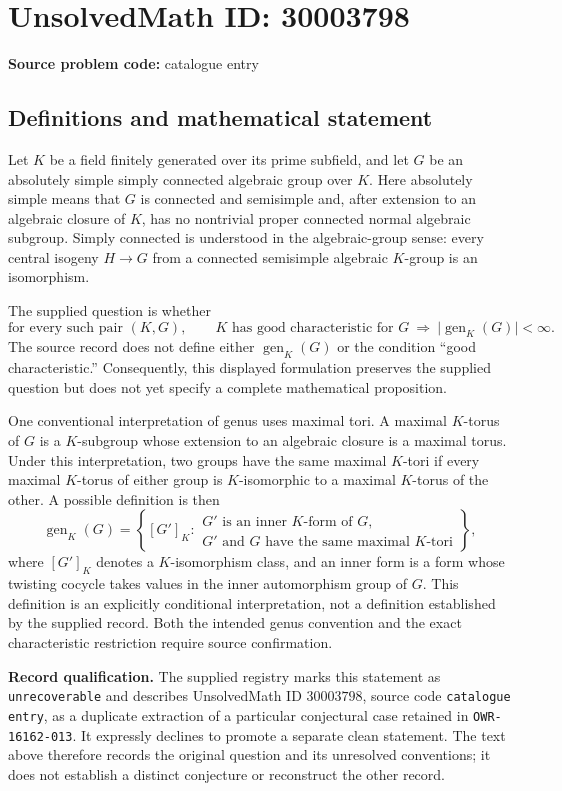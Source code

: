 \documentclass[11pt]{article}
\begin{document}
\section*{UnsolvedMath ID: 30003798}
\textbf{Source problem code:} catalogue entry
\subsection{Definitions and mathematical statement}
Let \(K\) be a field finitely generated over its prime subfield, and let \(G\) be an absolutely simple simply connected algebraic group over \(K\). Here absolutely simple means that \(G\) is connected and semisimple and, after extension to an algebraic closure of \(K\), has no nontrivial proper connected normal algebraic subgroup. Simply connected is understood in the algebraic-group sense: every central isogeny \(H\to G\) from a connected semisimple algebraic \(K\)-group is an isomorphism.

The supplied question is whether
\[
\text{for every such pair }(K,G),\qquad
K\text{ has good characteristic for }G
\ \Longrightarrow\ 
\bigl|\operatorname{gen}_{K}(G)\bigr|<\infty.
\]
The source record does not define either \(\operatorname{gen}_{K}(G)\) or the condition ``good characteristic.'' Consequently, this displayed formulation preserves the supplied question but does not yet specify a complete mathematical proposition.

One conventional interpretation of genus uses maximal tori. A maximal \(K\)-torus of \(G\) is a \(K\)-subgroup whose extension to an algebraic closure is a maximal torus. Under this interpretation, two groups have the same maximal \(K\)-tori if every maximal \(K\)-torus of either group is \(K\)-isomorphic to a maximal \(K\)-torus of the other. A possible definition is then
\[
\operatorname{gen}_{K}(G)=
\left\{
[G']_{K}:
\begin{array}{l}
G'\text{ is an inner }K\text{-form of }G,\\
G'\text{ and }G\text{ have the same maximal }K\text{-tori}
\end{array}
\right\},
\]
where \([G']_{K}\) denotes a \(K\)-isomorphism class, and an inner form is a form whose twisting cocycle takes values in the inner automorphism group of \(G\). This definition is an explicitly conditional interpretation, not a definition established by the supplied record. Both the intended genus convention and the exact characteristic restriction require source confirmation.

\textbf{Record qualification.} The supplied registry marks this statement as \texttt{unrecoverable} and describes UnsolvedMath ID \(30003798\), source code \texttt{catalogue entry}, as a duplicate extraction of a particular conjectural case retained in \texttt{OWR-16162-013}. It expressly declines to promote a separate clean statement. The text above therefore records the original question and its unresolved conventions; it does not establish a distinct conjecture or reconstruct the other record.
\end{document}
